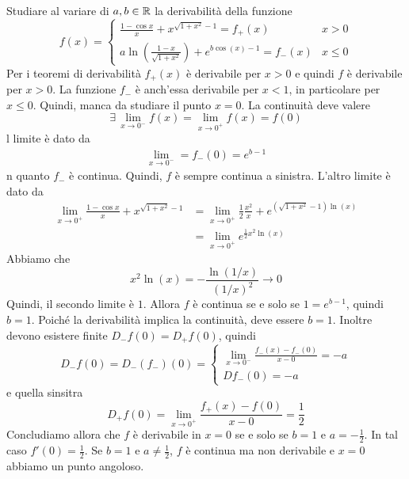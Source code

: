 \documentclass[a4paper]{article}
\begin{document}
\begin{snippetexercise}{Studiare al variare di \(a,b\in\mathbb{R}\) la derivabilità
    della funzione \[
        f(x) = \begin{cases}
            \frac{1-\cos x}{x} + x^{\sqrt{1 + x^2} - 1} = f_+(x) & x > 0 \\
            a \ln\left(\frac{1-x}{\sqrt{1+x^2}}\right) + e^{b \cos(x) - 1} =f_-(x) & x \leq 0
        \end{cases}
    \]}
    Per i teoremi di derivabilità \(f_+(x)\) è derivabile per \(x>0\)
    e quindi \(f\) è derivabile per \(x>0\).
    La funzione \(f_-\) è anch'essa derivabile per \(x<1\), in particolare per \(x\leq 0\).
    Quindi, manca da studiare il punto \(x=0\).
    La continuità deve valere
    \[
       \exists\,\lim_{x\to 0^-} f(x) = \lim_{x\to 0^+} f(x) = f(0) 
    \]
    l limite è dato da
    \begin{align*}
       \lim_{x\to 0^-} = f_-(0) = e^{b-1}
    \end{align*}
    n quanto \(f_-\) è continua. Quindi, \(f\) è sempre continua
    a sinistra. L'altro limite è dato da
    \begin{align*}
        \lim_{x\to 0^+} \frac{1-\cos x}{x} + x^{\sqrt{1 + x^2} - 1} &=
        \lim_{x\to 0^+} \frac{1}{2}\frac{x^2}{x} +
        e^{ \left(\sqrt{1 + x^2} - 1\right)\ln(x)} \\
        &= \lim_{x\to 0^+} e^{\frac{1}{2}x^2 \ln(x)}
    \end{align*}
    Abbiamo che
    \[
        x^2 \ln(x) = - \frac{\ln\left(1/x\right)}{{(1/x)}^2} \to 0
    \]
    Quindi, il secondo limite è \(1\).
    Allora \(f\) è continua se e solo se \(1 = e^{b-1}\), quindi \(b=1\).
    Poiché la derivabilità implica la continuità, deve essere \(b=1\).
    Inoltre devono esistere finite \(D_-f(0) = D_+f(0)\),
    quindi
    \[
        D_-f(0) = D_-(f_-)(0) = \begin{cases}
            \lim_{x\to 0^-} \frac{f_-(x) - f_-(0)}{x-0} = -a \\
            Df_-(0) = -a
        \end{cases}
    \]
    e quella sinsitra
    \[
        D_+f(0) = \lim_{x\to 0^+} \frac{f_+(x) - f(0)}{x-0}
        = \frac{1}{2}
    \]
    Concludiamo allora che \(f\) è derivabile in \(x=0\) 
    se e solo se \(b=1\) e \(a=-\frac{1}{2}\).
    In tal caso \(f'(0) = \frac{1}{2}\).
    Se \(b=1\) e \(a\neq \frac{1}{2}\), \(f\) è continua ma non derivabile e \(x=0\)
    abbiamo un punto angoloso.
\end{snippetexercise}
\end{document}
